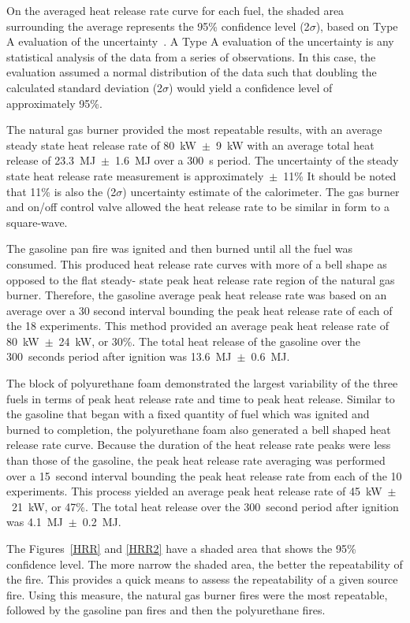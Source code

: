 \documentclass[twoside]{uocthesis}
\begin{document}
{On the averaged heat release rate curve for each fuel, the shaded area surrounding the average represents the 95\% confidence level (2$\sigma$), based on Type A evaluation of the uncertainty~\cite{Taylor:1994}.  A Type A evaluation of the uncertainty is any statistical analysis of the data from a series of observations.  In this case, the evaluation assumed a normal distribution of the data such that doubling the calculated standard deviation (2$\sigma$) would yield a confidence level of approximately 95\%.

The natural gas burner provided the most repeatable results, with an average steady state heat release rate of 80~kW~$\pm$~9~kW with an average total heat release of 23.3~MJ~$\pm$~1.6~MJ over a 300~s period. The uncertainty of the steady state heat release rate measurement is approximately~$\pm$~11\% It should be noted that 11\% is also the (2$\sigma$) uncertainty estimate of the calorimeter. The gas burner and on/off control valve allowed the heat release rate to be similar in form to a square-wave. 

The gasoline pan fire was ignited and then burned until all the fuel was consumed.  This produced heat release rate curves with more of a bell shape  as opposed to the flat steady- state peak heat release rate region of the natural gas burner.  Therefore, the  gasoline average peak heat release rate was based on an average over a 30 second interval bounding the peak heat release rate of each of the 18 experiments.  This method provided an average peak heat release rate of 80~kW~$\pm$~24~kW, or 30\%.  The total heat release of the gasoline over the 300~seconds period after ignition was 13.6~MJ~$\pm$~0.6~MJ.  

The block of polyurethane foam demonstrated the largest variability of the three fuels in terms of peak heat release rate and time to peak heat release. Similar to the gasoline that began with a fixed quantity of fuel which was ignited and burned to completion, the polyurethane foam also generated a bell shaped heat release rate curve.  Because the duration of the heat release rate peaks were less than those of the gasoline, the peak heat release rate averaging was performed over a 15~second interval bounding the peak heat release rate from each of the 10 experiments.  This process yielded an average peak heat release rate of 45~kW~$\pm$~21~kW, or 47\%.  The total heat release over the 300~second period after ignition was 4.1~MJ~$\pm$~0.2~MJ. 

The Figures~\ref{HRR} and \ref{HRR2} have a shaded area that shows the 95\% confidence level.  The more narrow the shaded area, the better the repeatability of the fire.  This provides a quick means to assess the repeatability of a given source fire.  Using this measure, the natural gas burner fires were the most repeatable, followed by the gasoline pan fires and then the polyurethane fires.       


}
\end{document}
